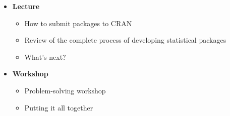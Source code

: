 \documentclass{article}
\begin{document}
\begin{itemize}

  \item {\bf Lecture}
    \begin{itemize}
      \item How to submit packages to CRAN
      \item Review of the complete process of developing statistical packages
      \item What's next?
    \end{itemize}
		
  \item {\bf Workshop}
    \begin{itemize}
      \item Problem-solving workshop
      \item Putting it all together
    \end{itemize}
	
\end{itemize}
\end{document}
